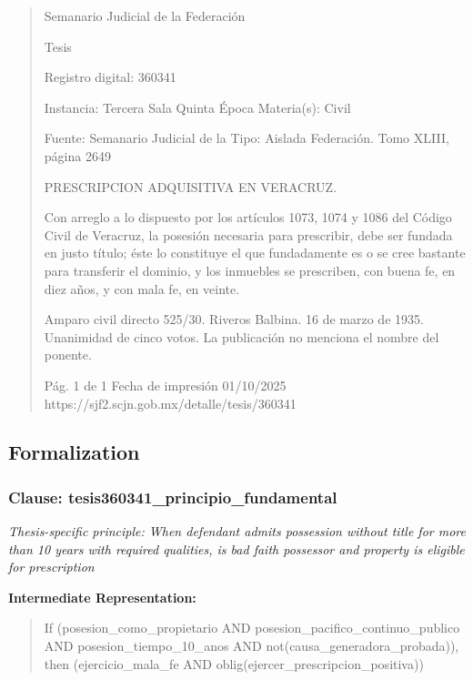 \documentclass[11pt,a4paper]{article}
\begin{document}
\begin{quote}
                                                   Semanario Judicial de la Federación

                                                  Tesis

 Registro digital: 360341

 Instancia: Tercera Sala          Quinta Época                         Materia(s): Civil

                                  Fuente: Semanario Judicial de la     Tipo: Aislada
                                  Federación.
                                  Tomo XLIII, página 2649


PRESCRIPCION ADQUISITIVA EN VERACRUZ.


Con arreglo a lo dispuesto por los artículos 1073, 1074 y 1086 del Código Civil de Veracruz, la
posesión necesaria para prescribir, debe ser fundada en justo título; éste lo constituye el que
fundadamente es o se cree bastante para transferir el dominio, y los inmuebles se prescriben, con
buena fe, en diez años, y con mala fe, en veinte.


Amparo civil directo 525/30. Riveros Balbina. 16 de marzo de 1935. Unanimidad de cinco votos. La
publicación no menciona el nombre del ponente.




                                             Pág. 1 de 1             Fecha de impresión 01/10/2025
  https://sjf2.scjn.gob.mx/detalle/tesis/360341

\end{quote}

\subsection{Formalization}

\subsubsection{Clause: tesis360341\_principio\_fundamental}

\textit{Thesis-specific principle: When defendant admits possession without title for more than 10 years with required qualities, is bad faith possessor and property is eligible for prescription}

\textbf{Intermediate Representation:}

\begin{quote}
If (posesion\_como\_propietario AND posesion\_pacifico\_continuo\_publico AND posesion\_tiempo\_10\_anos AND not(causa\_generadora\_probada)), then (ejercicio\_mala\_fe AND oblig(ejercer\_prescripcion\_positiva))
\end{quote}
\end{document}
